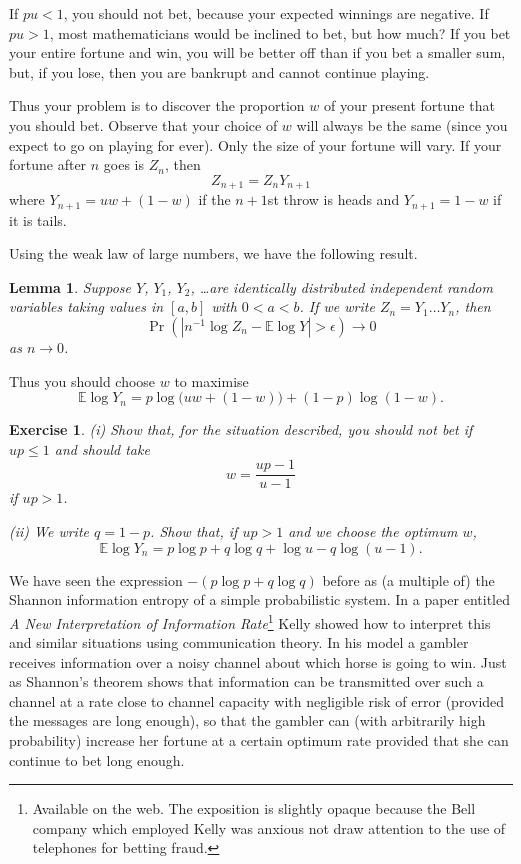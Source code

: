 \documentclass[12pt,a4paper]{article}
\theoremstyle{plain}
\newtheorem{lemma}[theorem]{Lemma}
\newtheorem{exercise}[theorem]{Exercise}
\theoremstyle{definition}
\begin{document}
If $pu<1$, you should not bet, because your expected winnings are
negative. If $pu>1$, most mathematicians would
be inclined to bet, but how much? If you bet your entire fortune
and win, you will be better off than if you bet
a smaller sum, but, if you lose, then you are bankrupt
and cannot continue playing. 

Thus your problem is to discover
the proportion $w$ of your present fortune
that you should bet. Observe that your choice of $w$ 
will always be the same (since 
you expect to go on playing for ever). Only the size of your 
fortune will vary. If your fortune after $n$ goes
is $Z_{n}$, then
\[Z_{n+1}=Z_{n}Y_{n+1}\]
where $Y_{n+1}=uw+(1-w)$ if the $n+1$st throw is heads
and $Y_{n+1}=1-w$ if it is tails. 

Using the weak law of large numbers, we have the following 
result.
\begin{lemma} Suppose $Y$, $Y_{1}$, $Y_{2}$, \dots are identically
distributed 
independent random variables taking values in $[a,b]$ with
$0<a<b$. If we write $Z_{n}=Y_{1}\dots Y_{n}$, then
\[\Pr(|n^{-1}\log Z_{n}-{\mathbb E}\log Y|>\epsilon)\rightarrow 0\]
as $n\rightarrow 0$.
\end{lemma}   

Thus you should choose $w$ to maximise 
\[{\mathbb E}\log Y_{n}=p\log\big(uw+(1-w)\big)+(1-p)\log(1-w).\]
\begin{exercise}\label{E;fast Kelly}  
(i) Show that, for the situation described,
you should not bet if $up\leq 1$ and should take
\[w=\frac{up-1}{u-1}\]
if $up>1$. 

(ii) We write $q=1-p$. Show that, if $up>1$ and we choose 
the optimum $w$,
\[{\mathbb E}\log Y_{n}=p\log p+q\log q+\log u-q\log(u-1).\]
\end{exercise}

We have seen the expression $-(p\log p+q\log q)$ before
as (a multiple of)
the Shannon information entropy of a simple probabilistic system.
In a paper entitled 
\emph{A New Interpretation of Information Rate}\footnote{Available
on the web. The exposition is slightly opaque because
the Bell company which employed Kelly was anxious
not draw attention to the use of telephones for
betting fraud.}
Kelly  showed how to interpret this and similar
situations using communication theory. In his model
a gambler receives information over a noisy channel
about which horse is going to win. Just as Shannon's theorem
shows that information can be transmitted over
such a channel at a rate close to channel capacity
with negligible risk of error (provided the
messages are long enough), so that the gambler can 
(with arbitrarily high probability)
increase her fortune at a certain optimum rate
provided that she can continue to bet long enough.
\end{document}
